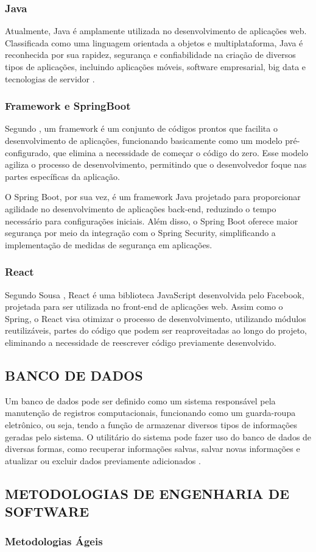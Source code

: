         \subsubsection*{Java}
            Atualmente, Java é amplamente utilizada no desenvolvimento de aplicações web. Classificada como uma linguagem orientada a objetos e multiplataforma, Java é reconhecida por sua rapidez, segurança e confiabilidade na criação de diversos tipos de aplicações, incluindo aplicações móveis, software empresarial, big data e tecnologias de servidor \cite{calcca2022analise}. 

        \subsubsection*{Framework e SpringBoot}
            Segundo \cite{calcca2022analise}, um framework é um conjunto de códigos prontos que facilita o desenvolvimento de aplicações, funcionando basicamente como um modelo pré-configurado, que elimina a necessidade de começar o código do zero. Esse modelo agiliza o processo de desenvolvimento, permitindo que o desenvolvedor foque nas partes específicas da aplicação.
            
            O Spring Boot, por sua vez, é um framework Java projetado para proporcionar agilidade no desenvolvimento de aplicações back-end, reduzindo o tempo necessário para configurações iniciais. Além disso, o Spring Boot oferece maior segurança por meio da integração com o Spring Security, simplificando a implementação de medidas de segurança em aplicações.
            
        \subsubsection*{React}
            Segundo Sousa \cite{sousa2025desenvolvimento}, React é uma biblioteca JavaScript desenvolvida pelo Facebook, projetada para ser utilizada no front-end de aplicações web. Assim como o Spring, o React visa otimizar o processo de desenvolvimento, utilizando módulos reutilizáveis, partes do código que podem ser reaproveitadas ao longo do projeto, eliminando a necessidade de reescrever código previamente desenvolvido.

    \subsection{BANCO DE DADOS}
        Um banco de dados pode ser definido como um sistema responsável pela manutenção de registros computacionais, funcionando como um guarda-roupa eletrônico, ou seja, tendo a função de armazenar diversos tipos de informações geradas pelo sistema. O utilitário do sistema pode fazer uso do banco de dados de diversas formas, como recuperar informações salvas, salvar novas informações e atualizar ou excluir dados previamente adicionados \cite{date2004introduccao}.


    \subsection{METODOLOGIAS DE ENGENHARIA DE SOFTWARE}

        \subsubsection*{Metodologias Ágeis}
        